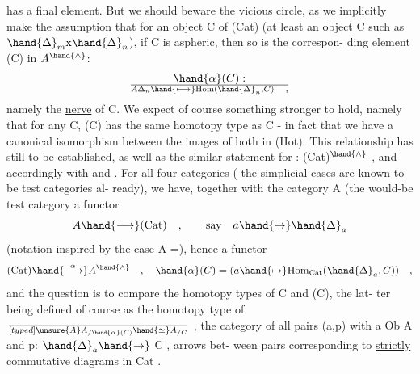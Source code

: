 has a final element.  But we should beware the vicious circle, as we
implicitly make the assumption that for an object C of (Cat)  (at least
an object C such as $\hand{\ensuremath{\Delta}}_{m}\mathrm{x}\hand{\ensuremath{\Delta}}_{n}$), if C is aspheric,  then so is the correspon-%
ding   element \hand{\ensuremath{\alpha}}(C) in $A^{\hand{\wedge}}$:
\[ \hand{\ensuremath{\alpha}}(C) : \over{A}{\Delta}_{n} \hand{\ensuremath{\longmapsto}} \mathrm{Hom}(\hand{\ensuremath{\Delta}}_{n},C) \quad , \]
namely the \uline{nerve} of C.  We expect of course something stronger to hold,
namely that for any C, \hand{\ensuremath{\alpha}}(C) has the same homotopy type as C  -  in fact
that we have a canonical isomorphism between the images of both in (Hot).
This relationship has still to be established,  as well as the similar
statement for \hand{\ensuremath{\beta}} : (Cat)\hand{\ensuremath{\to}}\over{\unsure{\hand{\ensuremath{\widetilde{\Delta}}}}}{\ensuremath{\square}}$^{\hand{\wedge}}$ , and accordingly with \hand{\ensuremath{\widetilde{\Delta}}} and \hand{\ensuremath{\widetilde{\square}}} .  For all
four categories ( the simplicial cases are known to be test categories al-%
ready),  we have,  together with the category A (the would-be test category\hand{),}
a functor
\[ A \hand{\ensuremath{\longrightarrow}} (\mathrm{Cat}) \quad , \qquad \text{say} \quad a \hand{\ensuremath{\mapsto}} \hand{\ensuremath{\Delta}}_{a} \]
(notation inspired by the case A =\hand{\ensuremath{\Delta}}),  hence a functor
\[ (\mathrm{Cat}) \hand{\ensuremath{\xrightarrow{\ \alpha\ }}} A^{\hand{\wedge}} \quad , \quad \hand{\ensuremath{\alpha}}(C) = (a \hand{\ensuremath{\mapsto}} \mathrm{Hom}_{\mathrm{Cat}}(\hand{\ensuremath{\Delta}}_{a},C)) \quad , \]
and the question is to compare the homotopy types of C and \hand{\ensuremath{\alpha}}(C),  the lat-%
ter being defined of course as the homotopy type of $\over[typed]{\unsure{A}}{A}_{/\hand{\ensuremath{\alpha}}(C)} \hand{\ensuremath{\simeq}} A_{/C}$ ,
the category of all pairs  (a,p) with a \hand{\ensuremath{\in}}Ob A and p: $\hand{\ensuremath{\Delta}}_{a}\hand{\ensuremath{\to}}$ C ,  arrows bet-%
ween pairs corresponding to \uline{strictly} commutative diagrams  in Cat
.

